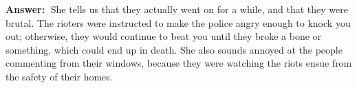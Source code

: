 \documentclass{article}
\newcommand{\answer}{\textbf{Answer:}$\;$}
\begin{document}
\begin{enumerate}[label=\arabic*)]
    \answer
    She tells us that they actually went on for a while, and that they were brutal.
    The rioters were instructed to make the police angry enough to knock you out;
    otherwise, they would continue to beat you until they broke a bone or something, which could end up in death.
    She also sounds annoyed at the people commenting from their windows, because they were watching the riots ensue from the safety of their homes.



    
    
\end{enumerate}
 
\end{document}
